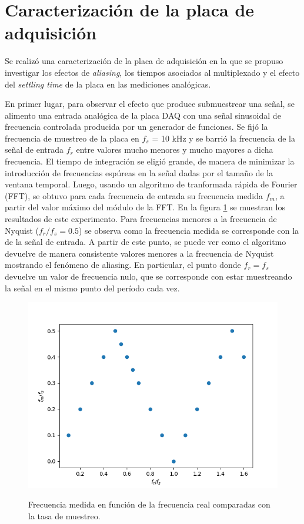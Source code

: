 \documentclass[a4paper,11pt]{article}
\begin{document}
\section{Caracterización de la placa de adquisición}

Se realizó una caracterización de la placa de adquisición en la que se propuso investigar los efectos de \textit{aliasing}, los tiempos asociados al multiplexado y el efecto del \textit{settling time} de la placa en las mediciones analógicas. 

En primer lugar, para observar el efecto que produce submuestrear una señal, se alimento una entrada analógica de la placa DAQ con una señal sinusoidal de frecuencia controlada producida por un generador de funciones. Se fijó la frecuencia de muestreo de la placa en $f_s$ = 10 kHz y se barrió la frecuencia de la señal de entrada $f_r$ entre valores mucho menores y mucho mayores a dicha frecuencia. El tiempo de integración se eligió grande, de manera de minimizar la introducción de frecuencias espúreas en la señal dadas por el tamaño de la ventana temporal. Luego, usando un algoritmo de tranformada rápida de Fourier (FFT), se obtuvo para cada frecuencia de entrada su frecuencia medida $f_m$, a partir del valor máximo del módulo de la FFT. En la figura \ref{fig:aliasing} se muestran los resultados de este experimento. Para frecuencias menores a la frecuencia de Nyquist ($f_r/f_s = 0.5$) se observa como la frecuencia medida se corresponde con la de la señal de entrada. A partir de este punto, se puede ver como el algoritmo devuelve de manera consistente valores menores a la frecuencia de Nyquist mostrando el fenómeno de aliasing. En particular, el punto donde $f_r = f_s$ devuelve un valor de frecuencia nulo, que se corresponde con estar muestreando la señal en el mismo punto del período cada vez.

\begin{figure}[h!]
\centering
\includegraphics[width=\columnwidth]{figs/alliasing.png}
\label{fig:aliasing}
\caption{Frecuencia medida en función de la frecuencia real comparadas con la tasa de muestreo.}
\end{figure}
\end{document}
